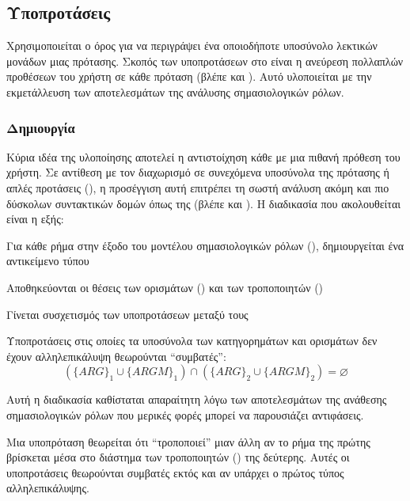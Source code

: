 \subsection{Υποπροτάσεις}\label{subsec:4-subsentences}
Χρησιμοποιείται ο όρος  για να περιγράψει ένα οποιοδήποτε υποσύνολο λεκτικών μονάδων μιας πρότασης.
Σκοπός των υποπροτάσεων στο \projectname{} είναι η ανεύρεση πολλαπλών προθέσεων του χρήστη σε κάθε πρόταση (βλέπε και ).
Αυτό υλοποιείται με την εκμετάλλευση των αποτελεσμάτων της ανάλυσης σημασιολογικών ρόλων.

\subsubsection{Δημιουργία}\label{subsec:4-subsentence-create}
Κύρια ιδέα της υλοποίησης αποτελεί η αντιστοίχηση κάθε  με μια πιθανή πρόθεση του χρήστη.
Σε αντίθεση με τον διαχωρισμό σε συνεχόμενα υποσύνολα της πρότασης ή απλές προτάσεις (),
η προσέγγιση αυτή επιτρέπει τη σωστή ανάλυση ακόμη και πιο δύσκολων συντακτικών δομών όπως της  (βλέπε και ).
Η διαδικασία που ακολουθείται είναι η εξής:
\begin{compactenum}
    \item Για κάθε ρήμα στην έξοδο του μοντέλου σημασιολογικών ρόλων (), δημιουργείται ένα αντικείμενο τύπου 
    \item Αποθηκεύονται οι θέσεις των ορισμάτων (\ARGs{}) και των τροποποιητών (\ARGM{})
    \item Γίνεται συσχετισμός των υποπροτάσεων μεταξύ τους
          \begin{compactenum}
              \item Υποπροτάσεις στις οποίες τα υποσύνολα των κατηγορημάτων και ορισμάτων δεν έχουν αλληλεπικάλυψη θεωρούνται \enquote{συμβατές}:
                    \begin{equation}
                        (\{ARG\}_1 \cup \{ARGM\}_1 ) \cap (\{ARG\}_2 \cup \{ARGM\}_2) = \varnothing
                    \end{equation}

                    Αυτή η διαδικασία καθίσταται απαραίτητη λόγω των αποτελεσμάτων της ανάθεσης σημασιολογικών ρόλων που μερικές φορές μπορεί να παρουσιάζει αντιφάσεις.
              \item Μια υποπρόταση θεωρείται ότι \enquote{τροποποιεί} μιαν άλλη αν το ρήμα της πρώτης βρίσκεται μέσα στο διάστημα των τροποποιητών (\ARGM{}) της δεύτερης.
                    Αυτές οι υποπροτάσεις θεωρούνται συμβατές εκτός και αν υπάρχει ο πρώτος τύπος αλληλεπικάλυψης.
          \end{compactenum}
\end{compactenum}

